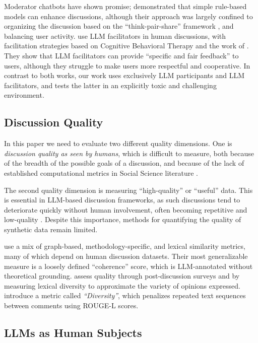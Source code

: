 Moderator chatbots have shown promise; \citet{kim_et_al_chatbot} demonstrated that simple rule-based models can enhance discussions, although their approach was largely confined to organizing the discussion based on the ``think-pair-share'' framework \cite{ahmad_2010_supporting, Navajas2018}, and balancing user activity. \citet{cho-etal-2024-language} use LLM facilitators in human discussions, with facilitation strategies based on Cognitive Behavioral Therapy and the work of \citet{rosenberg2015nonviolent}. They show that LLM facilitators can provide “specific and fair feedback” to users, although they struggle to make users more respectful and cooperative.  In contrast to both works, our work uses exclusively LLM participants and LLM facilitators, and tests the latter in an explicitly toxic and challenging environment.


\subsection{Discussion Quality}
\label{ssec:related:quality}

In this paper we need to evaluate two different quality dimensions. One is \emph{discussion quality as seen by humans}, which is difficult to measure, both because of the breadth of the possible goals of a discussion, and because of the lack of established computational metrics in Social Science literature \cite{korre2025evaluation}.

The second quality dimension is measuring “high-quality” or “useful” data. This is essential in LLM-based discussion frameworks, as such discussions tend to deteriorate quickly without human involvement, often becoming repetitive and low-quality \citep{ulmer2024}. Despite this importance, methods for quantifying the quality of synthetic data remain limited.

 \citet{balog_2024} use a mix of graph-based, methodology-specific, and lexical similarity metrics, many of which depend on human discussion datasets. Their most generalizable measure is a loosely defined “coherence” score, which is LLM-annotated without theoretical grounding. \citet{kim_et_al_chatbot} assess quality through post-discussion surveys and by measuring lexical diversity to approximate the variety of opinions expressed. \citet{ulmer2024}  introduce a metric called \emph{``Diversity''}, which penalizes repeated text sequences between comments using ROUGE-L \citep{lin-2004-rouge} scores.

\subsection{LLMs as Human Subjects}
\label{ssec:related:human-llm}

